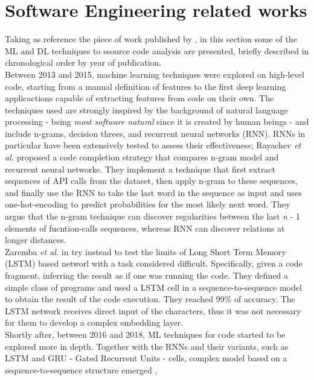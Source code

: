 \section{Software Engineering related works}
Taking as reference the piece of work published by \cite{barchi2022deep}, in this section some of the ML and
DL techniques to ssource code analysis are presented, briefly described in chronological order by 
year of publication.\\ 
Between 2013 and 2015, machine learning techniques were explored on high-level code, starting from a manual 
definition of features to the first deep learning applicactions capable of extracting features from code on their own.
The techniques used are strongly inspired by the background of natural language processing 
- being \textit{most software natural} \cite{hindle2016naturalness} since it is created by human beings - and include n-grams, decision threes, 
and recurrent neural networks (RNN). RNNs in particular have been extensively tested to assess their effectiveness;
Rayachev \textit{et al.} \cite{raychev2014code} proposed a code completion strategy that compares n-gram model and recurrent neural networks. 
They implement a technique that first extract sequences of API calls from the dataset, then apply n-gram to these sequences, and finally use the RNN 
to take the last word in the sequence as input and uses one-hot-encoding to predict probabilities for the most likely next word.
They argue that the n-gram technique can discover regularities between the last \textit{n} - 1 elements of fucntion-calls sequences, whereas RNN can discover
relations at longer distances.\\
Zaremba \textit{et al.} in \cite{zaremba2014learning} try instead to test the limits of Long Short Term Memory (LSTM) based networl with a task 
considered difficult. Specifically, given a code fragment, inferring the result as if one was running the code. They 
defined a simple class of programs and used a LSTM cell in a sequence-to-sequence model to obtain the result of the code execution. 
They reached 99\% of accuracy. The LSTM network receives direct input of the characters, thus it was not necessary for them to develop a complex 
embedding layer.\\
\newline
Shortly after, between 2016 and 2018, ML techniques for code started to be explored more in depth. Together with the RNNs and their variants,
such as LSTM and GRU - Gated Recurrent Units - cells, complex model based on a sequence-to-sequence structure emerged \cite{iyer2016summarizing},
